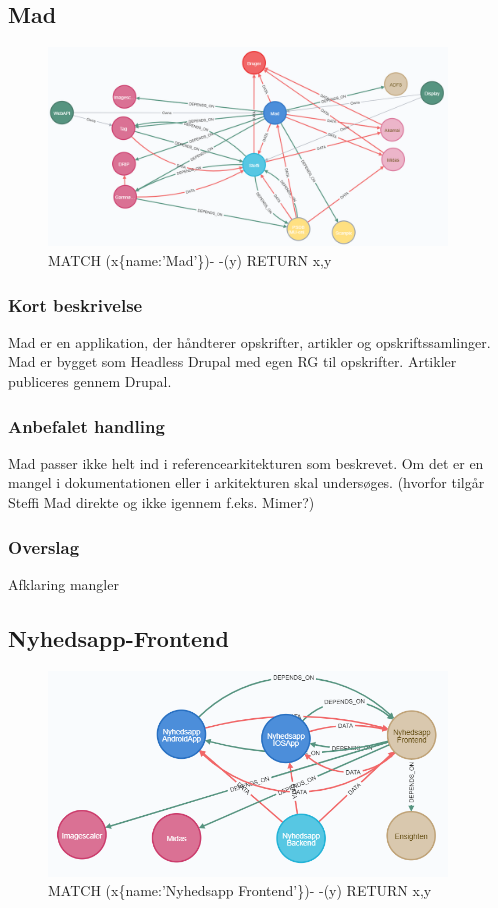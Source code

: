 \documentclass{article}
\begin{document}
\subsection{Mad}
\begin{figure}[h]
\includegraphics[width=300pt]{Mad.PNG}
\caption{MATCH (x\{name:'Mad'\})- -(y) RETURN x,y}
\end{figure}
\subsubsection{Kort beskrivelse}
Mad er en applikation, der håndterer opskrifter, artikler og opskriftssamlinger. Mad er bygget som Headless Drupal med egen RG til opskrifter. Artikler publiceres gennem Drupal. 
\subsubsection{Anbefalet handling}
Mad passer ikke helt ind i referencearkitekturen som beskrevet. Om det er en mangel i dokumentationen eller i arkitekturen skal undersøges. (hvorfor tilgår Steffi Mad direkte og ikke igennem f.eks. Mimer?)
\subsubsection{Overslag}
Afklaring mangler

\subsection{Nyhedsapp-Frontend}
\begin{figure}[h]
\includegraphics[width=300pt]{Nyhedsapp-Frontend.PNG}
\caption{MATCH (x\{name:'Nyhedsapp Frontend'\})- -(y) RETURN x,y}
\end{figure}
\end{document}
